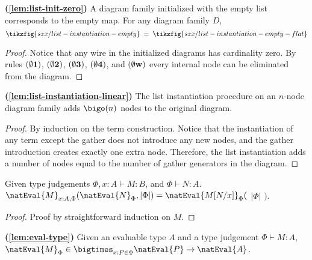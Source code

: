 \begin{lemma}{\!\textbf{(\ref{lem:list-init-zero})}}
    A diagram family initialized with the empty list corresponds to the empty map.
    For any diagram family $D$,
    \[
        \tikzfig{szx/list-instantiation-empty}
        \;=\;
        \tikzfig{szx/list-instantiation-empty-flat}
    \]
\end{lemma}

\begin{proof}
    Notice that any wire in the initialized diagrams has cardinality zero.
    By rules ${(\bf\emptyset 1)}$, ${(\bf\emptyset 2)}$, ${(\bf\emptyset 3)}$,
    ${(\bf\emptyset 4)}$, and ${(\bf \emptyset w)}$
    every internal node can be eliminated from the diagram.
\end{proof}

\begin{lemma}{\!\textbf{(\ref{lem:list-instantiation-linear})}}
    The list instantiation procedure on an $n$-node diagram family adds
    $\bigo(n)$ nodes to the original diagram.
\end{lemma}

\begin{proof}
    By induction on the term construction.
    Notice that the instantiation of any term except the gather
    does not introduce any new nodes, and the gather introduction
    creates exactly one extra node.
    Therefore, the list instantiation adds a number of nodes equal to
    the number of gather generators in the diagram.
\end{proof}

\begin{lemma}%
    \label{lem:eval-substitution}
    Given type judgements $\Phi, x:A \vdash M : B$, and $\Phi\vdash N : A$. $\natEval{M}_{x:A,\Phi} (\natEval{N}_{\Phi},|\Phi|)= \natEval{M[N/x]}_\Phi($ $|\Phi|$ $)$.
\end{lemma}

\begin{proof}
Proof by straightforward induction on $M$.
\end{proof}

\begin{lemma}{\!\textbf{(\ref{lem:eval-type})}}
    Given an evaluable type $A$ and a type judgement $\Phi \vdash M : A$,
    $\natEval{M}_\Phi \in \bigtimes_{x:P \in \Phi} \natEval{P} \to \natEval{A}$.
\end{lemma}

